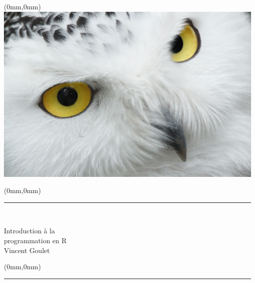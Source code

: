 \documentclass[letterpaper,11pt]{memoir}
\begin{document}
\frontmatter

\pagestyle{empty}

\textblockorigin{0mm}{0mm}
\setlength{\parindent}{0mm}

\begin{textblock*}{216mm}(0mm,0mm)
  \includegraphics{harfang2.jpg} \\
\end{textblock*}

\begin{textblock*}{10mm}(0mm,0mm)
  \rule{10mm}{279mm} \\
\end{textblock*}

\begin{adjustwidth*}{-12mm}{-72mm}
  \sffamily\color{white}
  \raggedright
  \vspace*{115mm}
  \fontsize{42}{42}\selectfont
  Introduction
  \fontsize{42}{42}\selectfont
  à la \\
  \fontsize{42}{42}\selectfont
  programmation
  \fontsize{42}{42}\selectfont
  en
  \fontsize{42}{42}\selectfont
  R \\
  \vspace*{20mm}
  \fontsize{24}{36}\selectfont
  Vincent Goulet
\end{adjustwidth*}

\newpage

\begin{textblock*}{216mm}(0mm,0mm)
  \rule{216mm}{10mm} \\
\end{textblock*}
\end{document}
